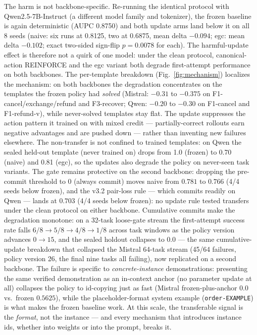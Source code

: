 The harm is not backbone-specific. Re-running the identical protocol
with Qwen2.5-7B-Instruct (a different model family and tokenizer),
the frozen baseline is again deterministic (AUPC 0.8750) and both
update arms land below it on all 8 seeds (naive: six runs at 0.8125,
two at 0.6875, mean delta $-0.094$; egc: mean delta $-0.102$; exact
two-sided sign-flip $p{=}0.0078$ for each). The harmful-update effect
is therefore not a quirk of one model: under the clean protocol,
canonical-action REINFORCE and the egc variant both degrade
first-attempt performance on both backbones. The per-template
breakdown (Fig.~\ref{fig:mechanism}) localizes the mechanism: on both
backbones the degradation concentrates on the templates the frozen
policy had \emph{solved} (Mistral: $-0.31$ to $-0.375$ on
F1-cancel/exchange/refund and F3-recover; Qwen: $-0.20$ to $-0.30$ on
F1-cancel and F1-refund-v), while never-solved templates stay flat.
The update suppresses the action pattern it trained on with mixed
credit --- partially-correct rollouts earn negative advantages and are
pushed down --- rather than inventing new failures elsewhere. The
non-transfer is not confined to trained templates: on Qwen the sealed
held-out template (never trained on) drops from 1.0 (frozen) to 0.70
(naive) and 0.81 (egc), so the updates also degrade the policy on
never-seen task variants. The gate remains protective on the second
backbone: dropping the pre-commit threshold to $0$ (always commit)
moves naive from $0.781$ to $0.766$ (4/4 seeds below frozen), and the
v3.2 pair-loss rule --- which commits readily on Qwen --- lands at
$0.703$ (4/4 seeds below frozen): no update rule tested transfers
under the clean protocol on either backbone. Cumulative commits make
the degradation monotone: on a 32-task loose-gate stream the
first-attempt success rate falls $6/8 \to 5/8 \to 4/8 \to 1/8$ across
task windows as the policy version advances $0 \to 15$, and the sealed
holdout collapses to $0.0$ --- the same cumulative-update breakdown
that collapsed the Mistral 64-task stream (45/64 failures, policy
version 26, the final nine tasks all failing), now replicated on a
second backbone. The failure is specific to \emph{concrete-instance}
demonstrations: presenting the same verified demonstration as an
in-context anchor (no parameter update at all) collapses the policy to
id-copying just as fast (Mistral frozen-plus-anchor $0.0$ vs.\ frozen
$0.5625$), while the placeholder-format system example
(\texttt{order-EXAMPLE}) is what makes the frozen baseline work. At
this scale, the transferable signal is the \emph{format}, not the
instance --- and every mechanism that introduces instance ids, whether
into weights or into the prompt, breaks it.

